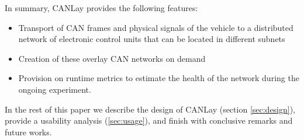 \documentclass[letterpaper,twocolumn,10pt]{article}
\begin{document}
In summary, CANLay provides the following features:
\begin{itemize}
    \item Transport of CAN frames and physical signals of the vehicle to a distributed network of electronic control units that can be located in different subnets
    \item Creation of these overlay CAN networks on demand
    \item Provision on runtime metrics to estimate the health of the network during the ongoing experiment.
\end{itemize}
In the rest of this paper we describe the design of CANLay (section \ref{sec:design}), provide a usability analysis (\ref{sec:usage}), and finish with conclusive remarks and future works.


\end{document}
